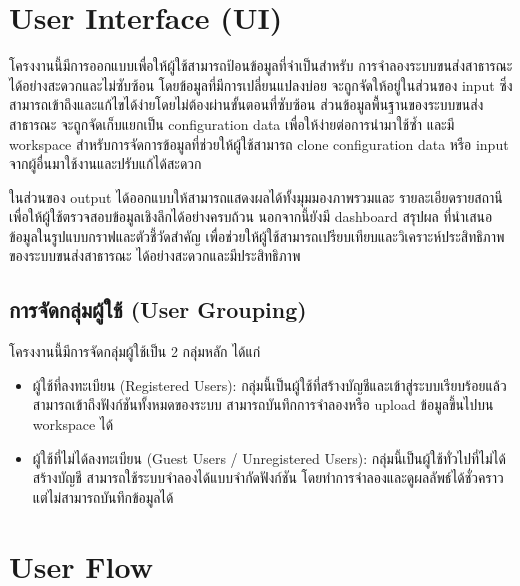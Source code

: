 \section{User Interface (UI)}
\begin{mypara}
    \indent โครงงานนี้มีการออกแบบเพื่อให้ผู้ใช้สามารถป้อนข้อมูลที่จำเป็นสำหรับ
    การจำลองระบบขนส่งสาธารณะได้อย่างสะดวกและไม่ซับซ้อน 
    โดยข้อมูลที่มีการเปลี่ยนแปลงบ่อย จะถูกจัดให้อยู่ในส่วนของ input 
    ซึ่งสามารถเข้าถึงและแก้ไขได้ง่ายโดยไม่ต้องผ่านขั้นตอนที่ซับซ้อน 
    ส่วนข้อมูลพื้นฐานของระบบขนส่งสาธารณะ จะถูกจัดเก็บแยกเป็น configuration data 
    เพื่อให้ง่ายต่อการนำมาใช้ซ้ำ และมี workspace สำหรับการจัดการข้อมูลที่ช่วยให้ผู้ใช้สามารถ 
    clone configuration data หรือ input จากผู้อื่นมาใช้งานและปรับแก้ได้สะดวก

  \indent ในส่วนของ output ได้ออกแบบให้สามารถแสดงผลได้ทั้งมุมมองภาพรวมและ
  รายละเอียดรายสถานี เพื่อให้ผู้ใช้ตรวจสอบข้อมูลเชิงลึกได้อย่างครบถ้วน นอกจากนี้ยังมี 
  dashboard สรุปผล ที่นำเสนอข้อมูลในรูปแบบกราฟและตัวชี้วัดสำคัญ 
  เพื่อช่วยให้ผู้ใช้สามารถเปรียบเทียบและวิเคราะห์ประสิทธิภาพของระบบขนส่งสาธารณะ
  ได้อย่างสะดวกและมีประสิทธิภาพ
\end{mypara}

\subsection{การจัดกลุ่มผู้ใช้ (User Grouping)}
\begin{mypara}
\indent โครงงานนี้มีการจัดกลุ่มผู้ใช้เป็น 2 กลุ่มหลัก ได้แก่
\begin{itemize}
    \item ผู้ใช้ที่ลงทะเบียน (Registered Users): กลุ่มนี้เป็นผู้ใช้ที่สร้างบัญชีและเข้าสู่ระบบเรียบร้อยแล้ว 
    สามารถเข้าถึงฟังก์ชันทั้งหมดของระบบ สามารถบันทึกการจำลองหรือ upload ข้อมูลขึ้นไปบน workspace ได้ 
    \item ผู้ใช้ที่ไม่ได้ลงทะเบียน (Guest Users / Unregistered Users): กลุ่มนี้เป็นผู้ใช้ทั่วไปที่ไม่ได้สร้างบัญชี 
    สามารถใช้ระบบจำลองได้แบบจำกัดฟังก์ชัน โดยทำการจำลองและดูผลลัพธ์ได้ชั่วคราว 
    แต่ไม่สามารถบันทึกข้อมูลได้
\end{itemize}
\end{mypara}
\section{User Flow}

